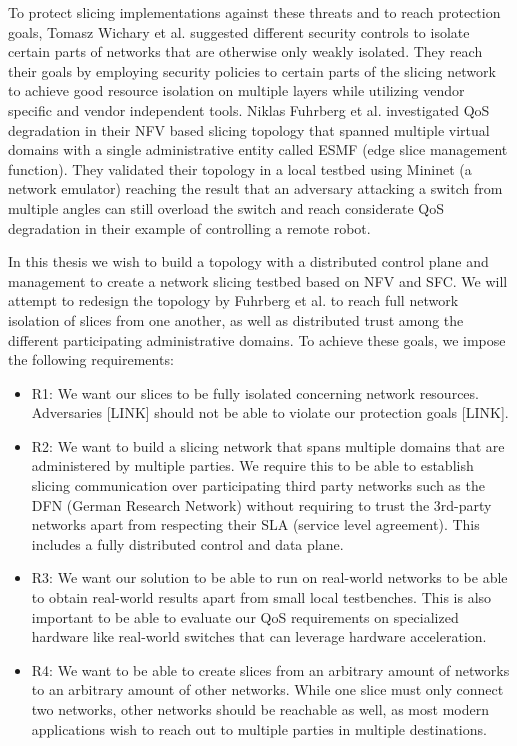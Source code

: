\documentclass{article}
\begin{document}
To protect slicing implementations against these threats and to reach protection goals, Tomasz Wichary et al. \cite{SE3} suggested different security controls to isolate certain parts of networks that are otherwise only weakly isolated. They reach their goals by employing security policies to certain parts of the slicing network to achieve good resource isolation on multiple layers while utilizing vendor specific and vendor independent tools. Niklas Fuhrberg et al. \cite{SE4} investigated QoS degradation in their NFV based slicing topology that spanned multiple virtual domains with a single administrative entity called ESMF (edge slice management function). They validated their topology in a local testbed using Mininet \cite{mininet} (a network emulator) reaching the result that an adversary attacking a switch from multiple angles can still overload the switch and reach considerate QoS degradation in their example of controlling a remote robot.

In this thesis we wish to build a topology with a distributed control plane and management to create a network slicing testbed based on NFV and SFC. We will attempt to redesign the topology by Fuhrberg et al. to reach full network isolation of slices from one another, as well as distributed trust among the different participating administrative domains.
To achieve these goals, we impose the following requirements:
\begin{itemize}
    \item R1: We want our slices to be fully isolated concerning network resources. Adversaries [LINK] should not be able to violate our protection goals [LINK].
    \item R2: We want to build a slicing network that spans multiple domains that are administered by multiple parties. We require this to be able to establish slicing communication over participating third party networks such as the DFN (German Research Network) without requiring to trust the 3rd-party networks apart from respecting their SLA (service level agreement). This includes a fully distributed control and data plane.
    \item R3: We want our solution to be able to run on real-world networks to be able to obtain real-world results apart from small local testbenches. This is also important to be able to evaluate our QoS requirements on specialized hardware like real-world switches that can leverage hardware acceleration.
    \item R4: We want to be able to create slices from an arbitrary amount of networks to an arbitrary amount of other networks. While one slice must only connect two networks, other networks should be reachable as well, as most modern applications wish to reach out to multiple parties in multiple destinations.
\end{itemize}
\end{document}
